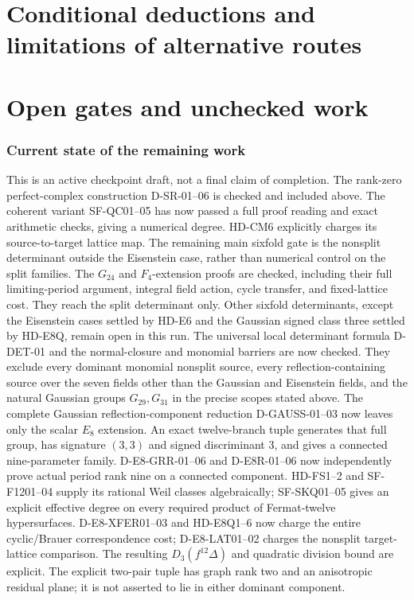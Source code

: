 \documentclass[11pt]{article}
\theoremstyle{remark}\newtheorem{remark}[theorem]{Remark}
\begin{document}
\part{Conditional deductions and limitations of alternative routes}


\part{Open gates and unchecked work}
\section{Current state of the remaining work}
This is an active checkpoint draft, not a final claim of completion.
The rank-zero perfect-complex construction D-SR-01--06 is checked and
included above. The coherent variant SF-QC01--05 has now passed a full
proof reading and exact arithmetic checks, giving a numerical degree.
HD-CM6 explicitly charges its source-to-target lattice map. The remaining
main sixfold gate is the nonsplit determinant outside the Eisenstein
case, rather than numerical control on the split families.
The $G_{24}$ and $F_4$-extension proofs are checked, including their full
limiting-period argument, integral field action, cycle transfer, and
fixed-lattice cost. They reach the split determinant only. Other sixfold
determinants, except the Eisenstein cases settled by HD-E6 and the
Gaussian signed class three settled by HD-E8Q, remain open in this
run. The universal local determinant formula D-DET-01 and
the normal-closure and monomial barriers are now checked. They exclude
every dominant monomial nonsplit source, every reflection-containing
source over the seven fields other than the Gaussian and Eisenstein
fields, and the natural Gaussian groups $G_{29},G_{31}$ in the
precise scopes stated above. The complete Gaussian reflection-component
reduction D-GAUSS-01--03 now leaves only the scalar $E_8$ extension.
An exact twelve-branch tuple generates that full group, has signature
$(3,3)$ and signed discriminant $3$, and gives a connected
nine-parameter family. D-E8-GRR-01--06 and D-E8R-01--06 now independently
prove actual period rank nine on a connected component. HD-FS1--2 and
SF-F1201--04 supply its rational Weil classes algebraically; SF-SKQ01--05
gives an explicit effective degree on every required product of
Fermat-twelve hypersurfaces. D-E8-XFER01--03 and HD-E8Q1--6 now
charge the entire cyclic/Brauer correspondence cost; D-E8-LAT01--02
charges the nonsplit target-lattice comparison. The resulting
$D_3(f^{12}\Delta)$ and quadratic division bound are explicit.
The explicit two-pair tuple has graph rank two and an anisotropic
residual plane; it is not asserted to lie in either dominant component.
\end{document}
